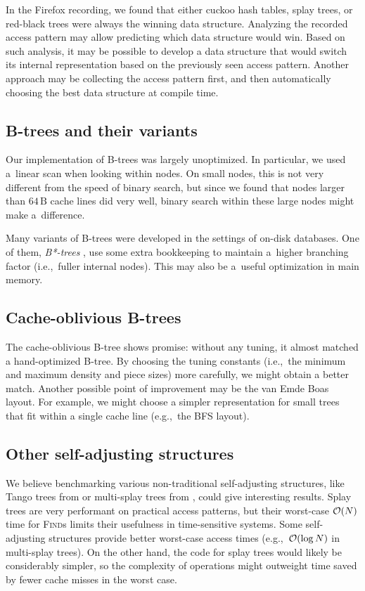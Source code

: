 In the Firefox recording, we found that either cuckoo hash tables, splay trees,
or red-black trees were always the winning data structure. Analyzing the
recorded access pattern may allow predicting which data structure would win.
Based on such analysis, it may be possible to develop a data structure that
would switch its internal representation based on the previously seen access
pattern. Another approach may be collecting the access pattern first, and
then automatically choosing the best data structure at compile time.

\subsection*{B-trees and their variants}
Our implementation of \mbox{B-trees} was largely unoptimized. In particular,
we used a~linear scan when looking within nodes. On small nodes, this is
not very different from the speed of binary search, but since we found
that nodes larger than $64\,\text{B}$ cache lines did very well, binary search
within these large nodes might make a~difference.

Many variants of B-trees were developed in the settings of on-disk databases.
One of them, \emph{B*-trees} \cite{bstar}, use some extra bookkeeping to
maintain a~higher branching factor (i.e.,\ fuller internal nodes).
This may also be a~useful optimization in main memory.

\subsection*{Cache-oblivious B-trees}
The cache-oblivious B-tree shows promise: without any tuning, it almost
matched a hand-optimized B-tree. By choosing the tuning constants (i.e.,\ the
minimum and maximum density and piece sizes) more carefully, we might obtain
a better match. Another possible point of improvement may be the van Emde Boas
layout. For example, we might choose a simpler representation for small trees
that fit within a single cache line (e.g.,\ the BFS layout).

\subsection*{Other self-adjusting structures}
We believe benchmarking various non-traditional self-adjusting structures,
like Tango trees from \cite{tango} or multi-splay trees from
\cite{multisplay-trees}, could give interesting results. Splay trees are very
performant on practical access patterns, but their worst-case $\mathcal{O}(N)$ time
for \textsc{Find}s limits their usefulness in time-sensitive systems. Some self-adjusting
structures provide better worst-case access times (e.g.,\ $\mathcal{O}(\log N)$ in
multi-splay trees). On the other hand, the code for splay trees would
likely be considerably simpler, so the complexity of operations might outweight
time saved by fewer cache misses in the worst case.

